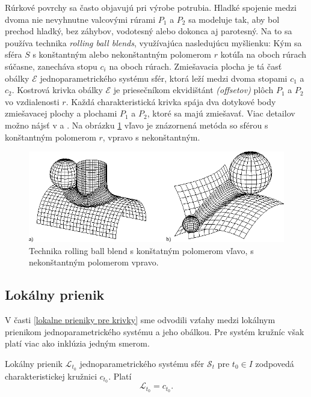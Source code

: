 Rúrkové povrchy sa často objavujú pri výrobe potrubia. Hladké spojenie medzi dvoma nie nevyhnutne valcovými rúrami $P_1$ a $P_2$ sa modeluje tak, aby bol prechod hladký, bez záhybov, vodotesný alebo dokonca aj parotesný. Na to sa používa technika \textit{rolling ball blends}, využívajúca nasledujúcu myšlienku: Kým sa sféra $S$ s konštantným alebo nekonštantným polomerom $r$ kotúľa na oboch rúrach súčasne, zanecháva stopu $c_i$ na oboch rúrach. Zmiešavacia plocha je tá časť obálky $\mathcal{E}$ jednoparametrického systému sfér, ktorá leží medzi dvoma stopami $c_1$ a $c_2$. Kostrová krivka obálky $\mathcal{E}$ je priesečníkom ekvidištánt \textit{(offsetov)} plôch $P_1$ a $P_2$ vo vzdialenosti $r$. Každá charakteristická krivka spája dva dotykové body zmiešavacej plochy a plochami $P_1$ a $P_2$, ktoré sa majú zmiešavať. Viac detailov možno nájsť v \cite{Kar00} a \cite{Ode20}. Na obrázku \ref{fig:rolling_ball_blends} vľavo je znázornená metóda so sférou s konštantným polomerom $r$, vpravo s nekonštantným.

\begin{figure}[H]
	\centering
	\includegraphics[width=\textwidth]{images/rolling_ball_blends.png}
	\caption[Technika rolling ball blends.]{Technika rolling ball blend s konštatným polomerom vľavo, s nekonštantným polomerom vpravo. \cite{Rollingballblends}}
	\label{fig:rolling_ball_blends}
\end{figure}

\subsection{Lokálny prienik}
V časti \ref{lokalne prieniky pre krivky} sme odvodili vzťahy medzi lokálnym prienikom jednoparametrického systému a jeho obálkou. Pre systém kružníc však platí viac ako inklúzia jedným smerom.

\begin{lemma} \label{lema o lokalnom prieniku sfer}
Lokálny prienik $\mathcal{L}_{t_0}$ jednoparametrického systému sfér $\mathcal{S}_t$ pre $t_0 \in I$ zodpovedá charakteristickej kružnici $c_{t_0}$. Platí $$
\mathcal{L}_{t_0} = c_{t_0}.
$$
\end{lemma}


